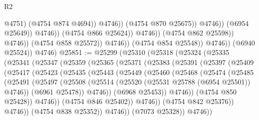 \begin{lexlean}{R2}
\begin{coremodule}
                                                    @4751)
                                                  (@4754 @874 @4694))
                                                @4746))
                                            (@4754 @870 @25675))
                                          @4746))
                                      (@6954 @25649))
                                    @4746))
                                (@4754 @866 @25624))
                              @4746))
                          (@4754 @862 @25598))
                        @4746))
                    (@4754 @858 @25572))
                  @4746))
              (@4754 @854 @25548))
            @4746))
        (@6940 @25524))
      @4746)
@25851 := @25299
    (@25310
      (@25318
        (@25324
          (@25335
            (@25341
              (@25347
                (@25359
                  (@25365
                    (@25371
                      (@25383
                        (@25391
                          (@25397
                            (@25409
                              (@25417
                                (@25423
                                  (@25435
                                    (@25443
                                      (@25449
                                        (@25460
                                          (@25468
                                            (@25474
                                              (@25485
                                                (@25491
                                                  (@25497
                                                    (@25508
                                                      (@25514
                                                        (@25520
                                                          (@25531 @25788 (@6954 @25501))
                                                          @4746))
                                                      (@6961 @25478))
                                                    @4746))
                                                (@6968 @25453))
                                              @4746))
                                          (@4754 @850 @25428))
                                        @4746))
                                    (@4754 @846 @25402))
                                  @4746))
                              (@4754 @842 @25376))
                            @4746))
                        (@4754 @838 @25352))
                      @4746))
                  (@7073 @25328))
                @4746))

\end{coremodule}
\end{lexlean}
